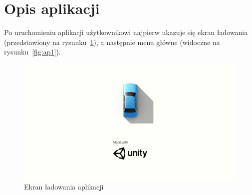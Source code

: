 \chapter*{Opis aplikacji}
Po uruchomieniu aplikacji użytkownikowi najpierw ukazuje się ekran ładowania (przedstawiony na rysunku~\ref{fig:splash}), a następnie menu główne (widoczne na rysunku~\ref{fig:ap1}).
\begin{figure}[h]
	\centering
	\includegraphics[width=1\linewidth]{splash}
	\caption[Ekran ładowania aplikacji]{Ekran ładowania aplikacji}
	\label{fig:splash}
\end{figure}

